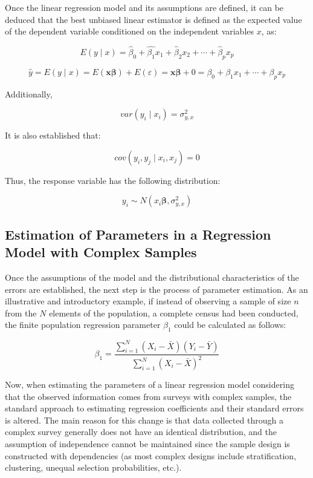 \documentclass[
  12pt,
]{book}
\begin{document}
Once the linear regression model and its assumptions are defined, it can be deduced that the best unbiased linear estimator is defined as the expected value of the dependent variable conditioned on the independent variables \(x\), as:

\[
E\left(y\mid x\right)=\hat{\beta}_{0}+\hat{\beta_{1}}x_{1}+\hat{\beta}_{2}x_{2}+\cdots+\hat{\beta}_{p}x_{p}
\]

\[
\hat{y}  =  E\left(y\mid x\right)
 =  E\left(\boldsymbol{x}\boldsymbol{\beta}\right)+E\left(\varepsilon\right)
=  \boldsymbol{x}\boldsymbol{\beta}+0
  =  \beta_{0}+\beta_{1}x_{1}+\cdots+\beta_{p}x_{p}
\]

Additionally,

\[
var\left(y_{i}\mid x_{i}\right)  =  \sigma_{y,x}^{2}
\]

It is also established that:

\[
cov\left(y_{i},y_{j}\mid x_{i},x_{j}\right)  = 0
\]

Thus, the response variable has the following distribution:

\[
y_{i}  \sim  N\left(x_{i}\boldsymbol{\beta},\sigma_{y,x}^{2}\right)
\]

\subsection{Estimation of Parameters in a Regression Model with Complex Samples}\label{estimation-of-parameters-in-a-regression-model-with-complex-samples}

Once the assumptions of the model and the distributional characteristics of the errors are established, the next step is the process of parameter estimation. As an illustrative and introductory example, if instead of observing a sample of size \(n\) from the \(N\) elements of the population, a complete census had been conducted, the finite population regression parameter \(\beta_{1}\) could be calculated as follows:

\[
\beta_{1}  =  \frac{ \sum_{i=1}^{N}\left(X_{i}-\bar{X}\right)\left(Y_{i}-\bar{Y}\right)}{\sum_{i=1}^{N}\left(X_{i}-\bar{X}\right)^{2}}
\]

Now, when estimating the parameters of a linear regression model considering that the observed information comes from surveys with complex samples, the standard approach to estimating regression coefficients and their standard errors is altered. The main reason for this change is that data collected through a complex survey generally does not have an identical distribution, and the assumption of independence cannot be maintained since the sample design is constructed with dependencies (as most complex designs include stratification, clustering, unequal selection probabilities, etc.).
\end{document}
